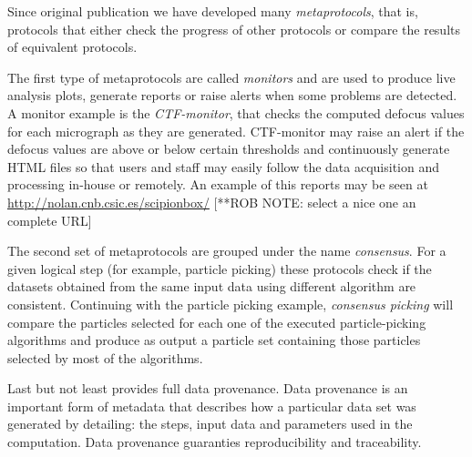 
Since \scipion original publication we have developed many \emph{metaprotocols}, that is, 
protocols that either check the progress of other protocols or compare the results of equivalent protocols.

The first type of metaprotocols are called \emph{monitors} and are used to produce live analysis plots, generate reports or raise alerts when some problems are detected. A monitor example is the \emph{CTF-monitor}, that checks the computed defocus values for
each micrograph as they are generated. CTF-monitor may raise an alert if the defocus values are above or below certain thresholds and continuously generate HTML files so that users and staff may easily follow the data acquisition and processing in-house or remotely. An example of this reports may be seen at \url{http://nolan.cnb.csic.es/scipionbox/} [**ROB NOTE: select a nice one an complete URL]%

The second set of metaprotocols are grouped under the name \emph{consensus}. For a given logical step (for example, particle picking) these protocols check if the datasets obtained from the same input data using different algorithm are consistent. Continuing with the particle picking example, \emph{consensus picking} will compare the particles selected for each one of the executed particle-picking algorithms and produce as output a particle set containing those particles selected by most of the algorithms.


Last but not least \scipion provides full data provenance. Data provenance is an important form of metadata that describes how a particular data set was generated by detailing: the steps, input data and parameters used in the computation. Data provenance guaranties reproducibility and traceability. %




 

